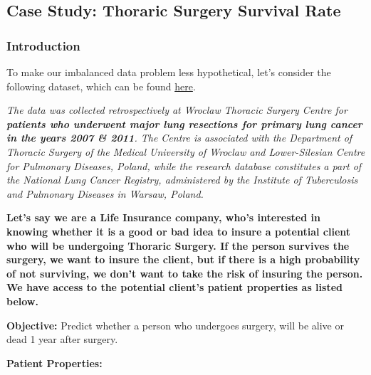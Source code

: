 \documentclass[11pt]{article}
\begin{document}
    \subsection{Case Study: Thoraric Surgery Survival
Rate}\label{case-study-thoraric-surgery-survival-rate}

\subsubsection{Introduction}\label{introduction}

To make our imbalanced data problem less hypothetical, let's consider
the following dataset, which can be found
\href{https://archive.ics.uci.edu/ml/datasets/Thoracic+Surgery+Data}{here}.

\emph{The data was collected retrospectively at Wroclaw Thoracic Surgery
Centre for \textbf{patients who underwent major lung resections for
primary lung cancer in the years 2007 \& 2011}. The Centre is associated
with the Department of Thoracic Surgery of the Medical University of
Wroclaw and Lower-Silesian Centre for Pulmonary Diseases, Poland, while
the research database constitutes a part of the National Lung Cancer
Registry, administered by the Institute of Tuberculosis and Pulmonary
Diseases in Warsaw, Poland.}

\textbf{Let's say we are a Life Insurance company, who's interested in
knowing whether it is a good or bad idea to insure a potential client
who will be undergoing Thoraric Surgery. If the person survives the
surgery, we want to insure the client, but if there is a high
probability of not surviving, we don't want to take the risk of insuring
the person. We have access to the potential client's patient properties
as listed below.}

\textbf{Objective:} Predict whether a person who undergoes surgery, will
be alive or dead 1 year after surgery.

\textbf{Patient Properties:}
\end{document}
